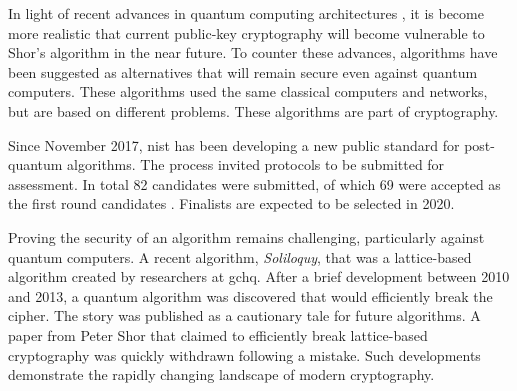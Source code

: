 In light of recent advances in quantum computing architectures \cite{arute2019quantum}, it is become more realistic that current public-key cryptography will become vulnerable to Shor's algorithm \cite{shor1994} in the near future. To counter these advances,  algorithms have been suggested as alternatives that will remain secure even against quantum computers. These algorithms used the same classical computers and networks, but are based on different problems. These algorithms are part of  cryptography.

Since November 2017, \ac{nist} has been developing a new public standard for post-quantum algorithms. The process invited protocols to be submitted for assessment. In total 82 candidates were submitted, of which 69 were accepted as the first round candidates \cite{alagic2019status}. Finalists are expected to be selected in 2020.

Proving the security of an algorithm remains challenging, particularly against quantum computers. A recent algorithm, \textit{Soliloquy}, that was a lattice-based algorithm created by researchers at \ac{gchq}. After a brief development between 2010 and 2013, a quantum algorithm was discovered that would efficiently break the cipher. The story was published as a cautionary tale for future algorithms. A paper from Peter Shor that claimed to efficiently break lattice-based cryptography was quickly withdrawn following a mistake\cite{eldar2016efficient}. Such developments demonstrate the rapidly changing landscape of modern cryptography.




